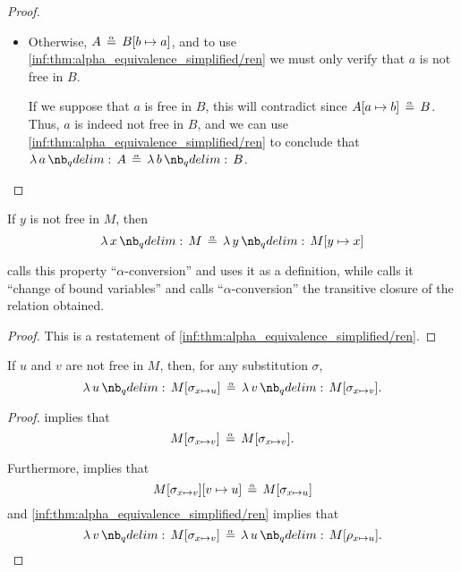 \begin{proof}
\begin{itemize}
    \item Otherwise, \( A \aequiv B[b \mapsto a] \), and to use \ref{inf:thm:alpha_equivalence_simplified/ren} we must only verify that \( a \) is not free in \( B \).

    If we suppose that \( a \) is free in \( B \), this will contradict  since \( A[a \mapsto b] \aequiv B \). Thus, \( a \) is indeed not free in \( B \), and we can use \ref{inf:thm:alpha_equivalence_simplified/ren} to conclude that \( \qabs a A \aequiv \qabs b B \).
  \end{itemize}
\end{proof}

\begin{corollary}\label{thm:alpha_conversion}
  If \( y \) is not free in \( M \), then
  \begin{equation}\label{eq:thm:alpha_conversion}
    \qabs x M \aequiv \qabs y M[y \mapsto x]
  \end{equation}
\end{corollary}
\begin{comments}
  \item {} calls this property \enquote{\( \alpha \)-conversion} and uses it as a definition, while  calls it \enquote{change of bound variables} and calls \enquote{\( \alpha \)-conversion} the transitive closure of the relation obtained.
\end{comments}
\begin{proof}
  This is a restatement of \ref{inf:thm:alpha_equivalence_simplified/ren}.
\end{proof}

\begin{corollary}\label{thm:alpha_conversion_modified}
  If \( u \) and \( v \) are not free in \( M \), then, for any substitution \( \sigma \),
  \begin{equation}\label{eq:thm:alpha_conversion_modified}
    \qabs u M[\sigma_{x \mapsto u}] \aequiv \qabs v M[\sigma_{x \mapsto v}].
  \end{equation}
\end{corollary}
\begin{proof}
   implies that
  \begin{equation*}
    M[\sigma_{x \mapsto v}] \aequiv M[\sigma_{x \mapsto v}].
  \end{equation*}

  Furthermore,  implies that
  \begin{equation*}
    M[\sigma_{x \mapsto v}][v \mapsto u] \aequiv M[\sigma_{x \mapsto u}]
  \end{equation*}
  and \ref{inf:thm:alpha_equivalence_simplified/ren} implies that
  \begin{equation*}
    \qabs v M[\sigma_{x \mapsto v}] \aequiv \qabs u M[\rho_{x \mapsto u}].
  \end{equation*}
\end{proof}

